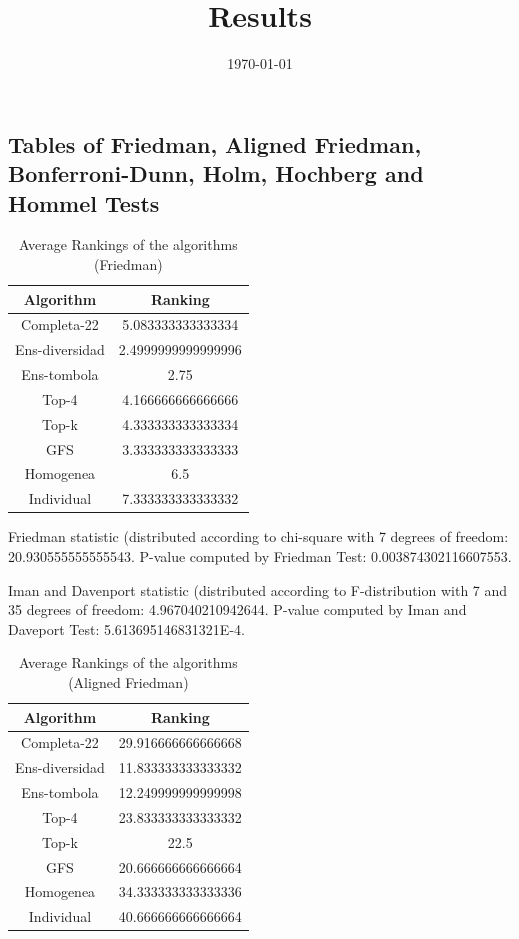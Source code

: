 \documentclass[a4paper,10pt]{article}
\title{Results}
\author{}
\date{\today}
\begin{document}
\begin{landscape}
\oddsidemargin 0in \topmargin 0in\maketitle
\section{Tables of Friedman, Aligned Friedman, Bonferroni-Dunn, Holm, Hochberg and Hommel Tests}
\begin{table}[!htp]
\centering
\caption{Average Rankings of the algorithms (Friedman)
}\begin{tabular}{c|c}
Algorithm&Ranking\\
\hline
Completa-22&5.083333333333334\\
Ens-diversidad&2.4999999999999996\\
Ens-tombola&2.75\\
Top-4&4.166666666666666\\
Top-k&4.333333333333334\\
GFS&3.333333333333333\\
Homogenea&6.5\\
Individual&7.333333333333332\\
\end{tabular}
\end{table}


Friedman statistic (distributed according to chi-square with 7 degrees of freedom: 20.930555555555543. 
P-value computed by Friedman Test: 0.003874302116607553.\newline

Iman and Davenport statistic (distributed according to F-distribution with 7 and 35 degrees of freedom: 4.967040210942644. 
P-value computed by Iman and Daveport Test: 5.613695146831321E-4.\newline


\newpage

\begin{table}[!htp]
\centering
\caption{Average Rankings of the algorithms (Aligned Friedman)
}\begin{tabular}{c|c}
Algorithm&Ranking\\
\hline
Completa-22&29.916666666666668\\
Ens-diversidad&11.833333333333332\\
Ens-tombola&12.249999999999998\\
Top-4&23.833333333333332\\
Top-k&22.5\\
GFS&20.666666666666664\\
Homogenea&34.333333333333336\\
Individual&40.666666666666664\\
\end{tabular}
\end{table}



\end{landscape}
\end{document}
